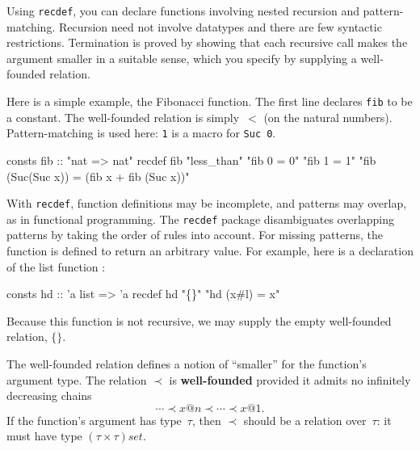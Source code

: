 Using \texttt{recdef}, you can declare functions involving nested recursion
and pattern-matching.  Recursion need not involve datatypes and there are few
syntactic restrictions.  Termination is proved by showing that each recursive
call makes the argument smaller in a suitable sense, which you specify by
supplying a well-founded relation.

Here is a simple example, the Fibonacci function.  The first line declares
\texttt{fib} to be a constant.  The well-founded relation is simply~$<$ (on
the natural numbers).  Pattern-matching is used here: \texttt{1} is a
macro for \texttt{Suc~0}.
\begin{ttbox}
consts fib  :: "nat => nat"
recdef fib "less_than"
    "fib 0 = 0"
    "fib 1 = 1"
    "fib (Suc(Suc x)) = (fib x + fib (Suc x))"
\end{ttbox}

With \texttt{recdef}, function definitions may be incomplete, and patterns may
overlap, as in functional programming.  The \texttt{recdef} package
disambiguates overlapping patterns by taking the order of rules into account.
For missing patterns, the function is defined to return an arbitrary value.
For example, here is a declaration of the list function :
\begin{ttbox}
consts hd :: 'a list => 'a
recdef hd "\{\}"
    "hd (x#l) = x"
\end{ttbox}
Because this function is not recursive, we may supply the empty well-founded
relation, $\{\}$.

The well-founded relation defines a notion of ``smaller'' for the function's
argument type.  The relation $\prec$ is \textbf{well-founded} provided it
admits no infinitely decreasing chains
\[ \cdots\prec x@n\prec\cdots\prec x@1. \]
If the function's argument has type~$\tau$, then $\prec$ should be a relation
over~$\tau$: it must have type $(\tau\times\tau)set$.

